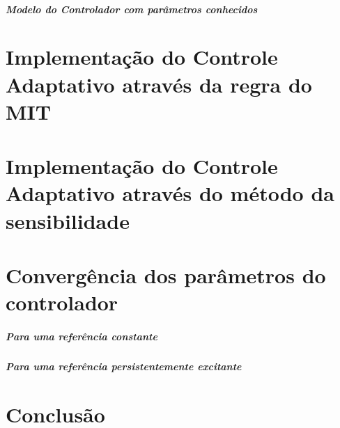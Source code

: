 \documentclass[a4paper,11pt]{report}
\begin{document}
\paragraph{Modelo do Controlador com parâmetros conhecidos}
\chapter{Implementação do Controle Adaptativo através da regra do MIT}

\chapter{Implementação do Controle Adaptativo através do método da sensibilidade}

\chapter{Convergência dos parâmetros do controlador}
\paragraph{Para uma referência constante}
\paragraph{Para uma referência persistentemente excitante}
\chapter{Conclusão}
\end{document}
